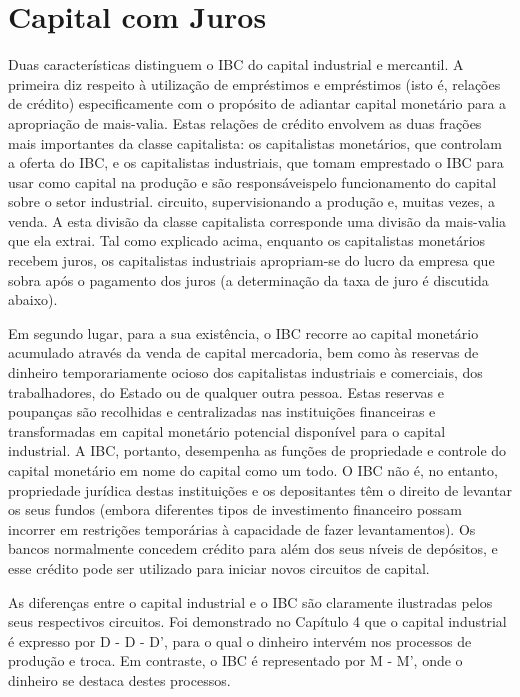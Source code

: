 \section{Capital com Juros}
 \par 
Duas características distinguem o IBC do capital industrial e mercantil. A primeira diz respeito à utilização de empréstimos e empréstimos (isto é, relações de crédito) especificamente com o propósito de adiantar capital monetário para a apropriação de mais-valia. Estas relações de crédito envolvem as duas frações mais importantes da classe capitalista: os capitalistas monetários, que controlam a oferta do IBC, e os capitalistas industriais, que tomam emprestado o IBC para usar como capital na produção e são responsáveis ​​pelo funcionamento do capital sobre o setor industrial. circuito, supervisionando a produção e, muitas vezes, a venda. A esta divisão da classe capitalista corresponde uma divisão da mais-valia que ela extrai. Tal como explicado acima, enquanto os capitalistas monetários recebem juros, os capitalistas industriais apropriam-se do lucro da empresa que sobra após o pagamento dos juros (a determinação da taxa de juro é discutida abaixo).
 \par 
Em segundo lugar, para a sua existência, o IBC recorre ao capital monetário acumulado através da venda de capital mercadoria, bem como às reservas de dinheiro temporariamente ocioso dos capitalistas industriais e comerciais, dos trabalhadores, do Estado ou de qualquer outra pessoa. Estas reservas e poupanças são recolhidas e centralizadas nas instituições financeiras e transformadas em capital monetário potencial disponível para o capital industrial. A IBC, portanto, desempenha as funções de propriedade e controle do capital monetário em nome do capital como um todo. O IBC não é, no entanto, propriedade jurídica destas instituições e os depositantes têm o direito de levantar os seus fundos (embora diferentes tipos de investimento financeiro possam incorrer em restrições temporárias à capacidade de fazer levantamentos). Os bancos normalmente concedem crédito para além dos seus níveis de depósitos, e esse crédito pode ser utilizado para iniciar novos circuitos de capital.
 \par 
As diferenças entre o capital industrial e o IBC são claramente ilustradas pelos seus respectivos circuitos. Foi demonstrado no Capítulo {\color{blue}4} que o capital industrial é expresso por D - D - D', para o qual o dinheiro intervém nos processos de produção e troca. Em contraste, o IBC é representado por M - M', onde o dinheiro se destaca destes processos.
